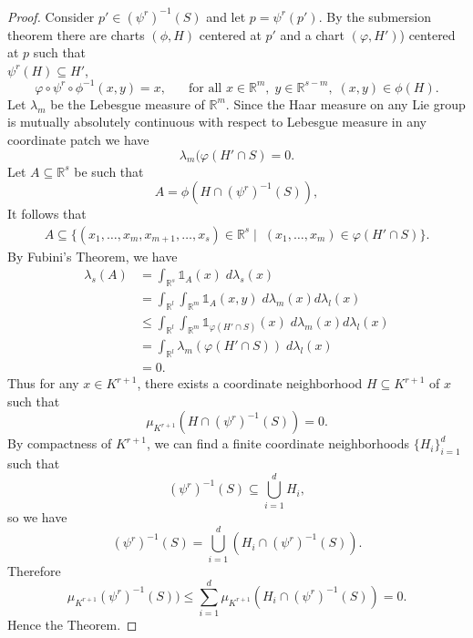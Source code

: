 \documentclass[11pt,a4paper]{amsart}
\theoremstyle{definition}
\numberwithin{equation}{section}
\begin{document}
\begin{proof}
Consider $p'\in  (\psi^r)^{-1}(S)$  and let $p=\psi^r(p')$. {   By the submersion theorem }
there are charts  $ (\phi , H)$  centered at $p'$ and a chart  $(\varphi
, H')$)  centered at $p$ such that \\ $\psi^r(H)\subseteq H'$,  $$\varphi
 \circ \psi^r\circ \phi^{-1}(x,y)=x, \;\;\;\;\; \text { for all } x\in \mathbb{R}^m, \;y\in \mathbb{R}^{s-m},\; (x,y)\in \phi(H).$$
Let $\lambda_m$ be the Lebesgue measure of $\mathbb{R}^m$.     Since  the  Haar   measure on any Lie group is mutually absolutely continuous with respect to  Lebesgue  measure in any coordinate patch we have  $$\lambda_m(\varphi
 (H'\cap S)=0.$$ 
   Let $A\subseteq \mathbb{R}^s  $ be such that $$ A= \phi(H\cap (\psi^r)^{-1}(S)), $$ It follows that
   \begin{align*}
   A\subseteq \lbrace (x_1, \dots , x_m, x_{m+1}, \dots , x_s) \in \mathbb{R}^s \mid\; (x_1, \dots , x_m)\in \varphi
 (H'\cap S)\rbrace.
      \end{align*} By Fubini's Theorem, we have 
      \begin{align*}
      \lambda_{s} (A) &= \int_{\mathbb{R}^s} {\mathds{1}}_A(x) \;d\lambda_s(x)\\&
      = \int_{\mathbb{R}^l}\int_{\mathbb{R}^m} {\mathds{1}}_A(x,y) \;d\lambda_m(x)d\lambda_l(x) \\&\leq  \int_{\mathbb{R}^l}\int_{\mathbb{R}^m} {\mathds{1}}_{\varphi
 (H'\cap S)}(x) \;d\lambda_m(x)d\lambda_l(x)\\&= \int_{\mathbb{R}^l} \lambda_m( \varphi (H'\cap S)) \;d\lambda_l(x)\\&= 0.
      \end{align*}
Thus  for any  $x\in K^{r+1}$, there exists a  coordinate neighborhood $H \subseteq K^{r+1}$ of $x$ such that  $$\mu_{K^{r+1}}( H\cap (\psi^r)^{-1}(S))= 0.$$   
 By compactness of $K^{r+1}$, we can find a finite coordinate neighborhoods $\lbrace H_i \rbrace_{i=1}^d$ such that $$ (\psi^r)^{-1}(S) \subseteq \bigcup _{i=1}^d H_i,$$  so we have $$ (\psi^r)^{-1}(S) = \bigcup _{i=1}^d (H_i \cap (\psi^r)^{-1}(S)).$$ Therefore  $$\mu_{K^{r+1}} (\psi^r)^{-1}(S)) \leq \sum_{i=1}^d \mu_{K^{r+1}}( H_i\cap (\psi^r)^{-1}(S))=0.$$     
      Hence the Theorem.    
\end{proof}
\end{document}
